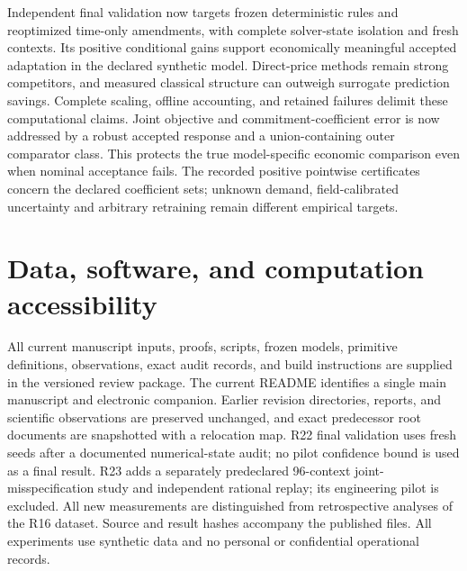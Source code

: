 \documentclass[11pt,letterpaper]{article}
\theoremstyle{definition}
\newcommand{\1}{\mathbf 1}
\begin{document}
Independent final validation now targets frozen deterministic rules and reoptimized time-only amendments, with complete solver-state isolation and fresh contexts. Its positive conditional gains support economically meaningful accepted adaptation in the declared synthetic model. Direct-price methods remain strong competitors, and measured classical structure can outweigh surrogate prediction savings. Complete scaling, offline accounting, and retained failures delimit these computational claims. Joint objective and commitment-coefficient error is now addressed by a robust accepted response and a union-containing outer comparator class. This protects the true model-specific economic comparison even when nominal acceptance fails. The recorded positive pointwise certificates concern the declared coefficient sets; unknown demand, field-calibrated uncertainty and arbitrary retraining remain different empirical targets.
\section*{Data, software, and computation accessibility}
All current manuscript inputs, proofs, scripts, frozen models, primitive definitions, observations, exact audit records, and build instructions are supplied in the versioned review package. The current README identifies a single main manuscript and electronic companion. Earlier revision directories, reports, and scientific observations are preserved unchanged, and exact predecessor root documents are snapshotted with a relocation map. R22 final validation uses fresh seeds after a documented numerical-state audit; no pilot confidence bound is used as a final result. R23 adds a separately predeclared 96-context joint-misspecification study and independent rational replay; its engineering pilot is excluded. All new measurements are distinguished from retrospective analyses of the R16 dataset. Source and result hashes accompany the published files. All experiments use synthetic data and no personal or confidential operational records.
\clearpage\label{r19-reference-start}
\end{document}
